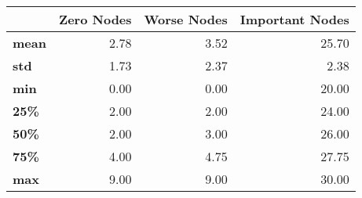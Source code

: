 \begin{tabular}{lrrr}
\toprule
{} &  Zero Nodes &  Worse Nodes &  Important Nodes \\
\midrule
\textbf{mean} &        2.78 &         3.52 &            25.70 \\
\textbf{std } &        1.73 &         2.37 &             2.38 \\
\textbf{min } &        0.00 &         0.00 &            20.00 \\
\textbf{25\% } &        2.00 &         2.00 &            24.00 \\
\textbf{50\% } &        2.00 &         3.00 &            26.00 \\
\textbf{75\% } &        4.00 &         4.75 &            27.75 \\
\textbf{max } &        9.00 &         9.00 &            30.00 \\
\bottomrule
\end{tabular}

